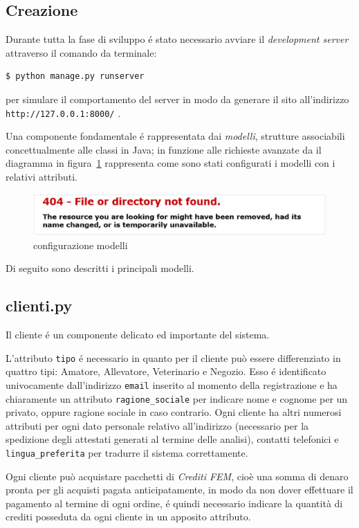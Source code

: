 \subsection{Creazione}
Durante tutta la fase di sviluppo é stato necessario avviare il \emph{development server} attraverso il comando da terminale:
\begin{verbatim}
$ python manage.py runserver
\end{verbatim}
per simulare il comportamento del server in modo da generare il sito all'indirizzo \texttt{http://127.0.0.1:8000/} .

Una componente fondamentale é rappresentata dai \emph{modelli}, strutture associabili concettualmente alle classi in Java; in funzione alle richieste avanzate da {\fem} il diagramma in figura~\ref{fig:modelli} rappresenta come sono stati configurati i modelli con i relativi attributi.

\begin{figure}
 \includegraphics[width=1\textwidth]{images/filenotfound} 
 \caption{configurazione modelli}
 \label{fig:modelli}
\end{figure}

Di seguito sono descritti i principali modelli.

\subsection*{clienti.py}
\label{subs:clienti}
Il cliente é un componente delicato ed importante del sistema. 

L'attributo \texttt{tipo} é necessario in quanto per {\fem} il cliente può essere differenziato in quattro tipi: Amatore, Allevatore, Veterinario e Negozio. Esso é identificato univocamente dall'indirizzo \texttt{email} inserito al momento della registrazione e ha chiaramente un attributo \texttt{ragione\_sociale} per indicare nome e cognome per un privato, oppure ragione sociale in caso contrario. Ogni cliente ha altri numerosi attributi per ogni dato personale relativo all'indirizzo (necessario per la spedizione degli attestati generati al termine delle analisi), contatti telefonici e \texttt{lingua\_preferita} per tradurre il sistema correttamente.

Ogni cliente può acquistare pacchetti di \emph{Crediti FEM}, cioè una somma di denaro pronta per gli acquisti pagata anticipatamente, in modo da non dover effettuare il pagamento al termine di ogni ordine, é quindi necessario indicare la quantità di crediti posseduta da ogni cliente in un apposito attributo.

